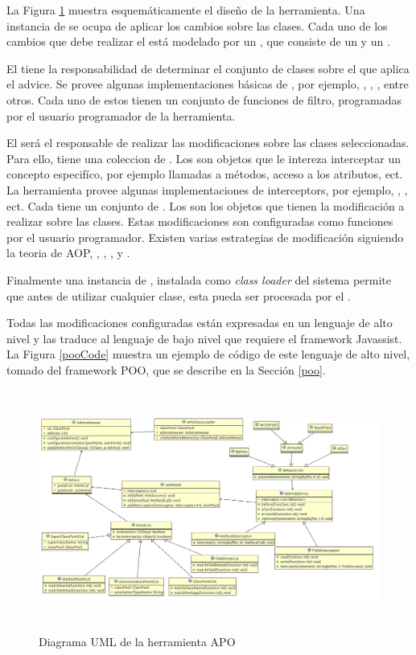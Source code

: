 	La Figura \ref{aopImage} muestra esquemáticamente el diseño de la herramienta.
	Una instancia de  se ocupa de aplicar los cambios sobre las
	clases.
	Cada uno de los cambios que debe realizar el  está
	modelado por un , que consiste de un  y un
	.
	
	El  tiene la responsabilidad de determinar el conjunto de
	clases sobre el que aplica el advice. Se provee algunas implementaciones básicas
	de , por ejemplo, , , 
	, entre otros. Cada uno de estos  tienen un conjunto de funciones
	de filtro, programadas por el usuario programador de la herramienta. 

	El  será el responsable de realizar las modificaciones 
	sobre las clases seleccionadas. Para ello, tiene una coleccion de .
 	Los   son objetos que le intereza interceptar un concepto especifíco,  por ejemplo
 	llamadas a métodos, acceso a los atributos, ect. La herramienta provee algunas implementaciones de interceptors,
 	por ejemplo, , , ect. 
 	Cada  tiene un conjunto de .
 	Los  son los objetos que tienen la modificación a realizar sobre las clases. 
 	Estas modificaciones son configuradas como funciones por el usuario programador.
 	Existen varias estrategias de modificación siguiendo la teoria de AOP, , , ,
 	 y . 
	 
	Finalmente una instancia de , instalada como \emph{class
	loader} del sistema permite que antes de utilizar cualquier clase, esta pueda
	ser procesada por el .
	
	Todas las modificaciones configuradas están expresadas en un
	lenguaje de alto nivel y las traduce al lenguaje de bajo nivel que requiere el
	framework Javassist.
	La Figura \ref{pooCode} muestra un ejemplo de código de este lenguaje de alto nivel,
	tomado del framework POO, que se describe en la Sección \ref{poo}.
	
	\begin{figure}[h]
		\centering
		\includegraphics[width=450px, height=300px]{img/apo}
		\caption{Diagrama UML de la herramienta APO}
		\label{aopImage}
	\end{figure}	 
	
